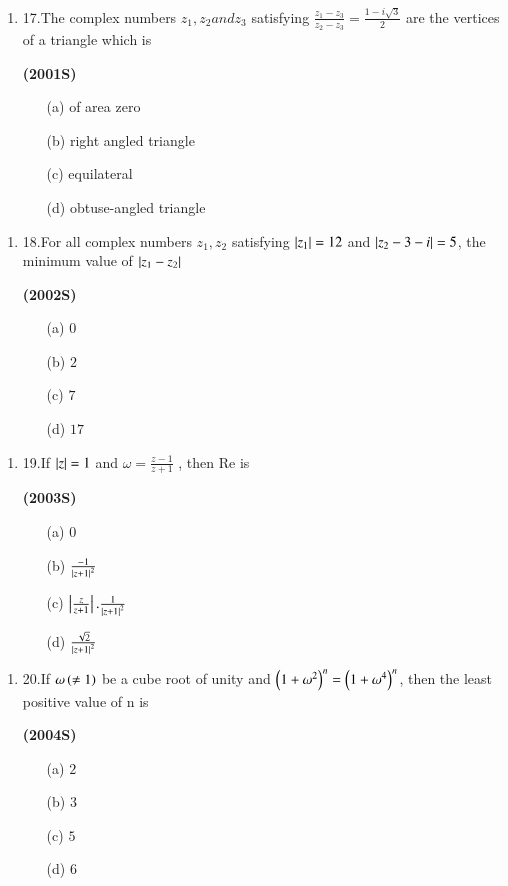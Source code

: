 \documentclass[journal,12pt,twocolumn]{IEEEtran}
\theoremstyle{remark}
\begin{document}
\begin{enumerate}
\item{17.}The complex numbers $z_1,z_2 and z_3$ satisfying $\frac{z_1-z_3}{z_2-z_3}=\frac{1-i\sqrt{3}}{2}$ are the vertices of a triangle which is

\hfill{\textbf{(2001S)}}

\begin{enumerate}
\item[(a)]of area zero
\item[(b)]right angled triangle
\item[(c)]equilateral
\item[(d)]obtuse-angled triangle
\end{enumerate}
\end{enumerate}
\begin{enumerate}
\item{18.}For all complex numbers $z_1,z_2$ satisfying $\left\vert z_1\right\vert=12$ and $\left\vert z_2-3-i\right\vert=5$, the minimum value of $\left\vert z_1-z_2\right\vert$

\hfill{\textbf{(2002S)}}

\begin{enumerate}
\item[(a)]$0$
\item[(b)]$2$
\item[(c)]$7$
\item[(d)]$17$
\end{enumerate}
\end{enumerate}
\begin{enumerate}
\item{19.}If $\left\vert z\right\vert=1$ and $\omega=\frac{z-1}{z+1}$ , then Re\brak{\omega} is

\hfill{\textbf{(2003S)}}

\begin{enumerate}
\item[(a)]$0$
\item[(b)]$\frac{-1}{\left\vert z+1\right\vert^2}$
\item[(c)]$\left\vert\frac{z}{z+1}\right\vert.\frac{1}{\left\vert z+1\right\vert^2}$
\item[(d)]$\frac{\sqrt{2}}{\left\vert z+1\right\vert^2}$
\end{enumerate}
\end{enumerate}
\begin{enumerate}
\item{20.}If $\omega\left(\neq1\right)$ be a cube root of unity and $\left(1+\omega^2\right)^n = \left(1+\omega^4\right)^n$, then the least positive value of n is

\hfill{\textbf{(2004S)}}

\begin{enumerate}
\item[(a)]$2$
\item[(b)]$3$
\item[(c)]$5$
\item[(d)]$6$
\end{enumerate}
\end{enumerate}
\end{document}
